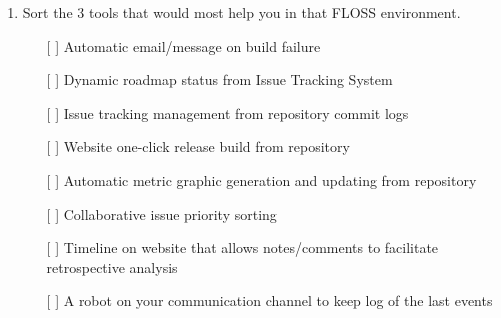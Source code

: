 \documentclass[lnbip]{svmultln}
\begin{document}
\begin{enumerate}
\item Sort the 3 tools that would most help you in that FLOSS
  environment.
  \begin{itemize}
  \item[[ ] ] Automatic email/message on build failure
  \item[[ ] ] Dynamic roadmap status from Issue Tracking System
  \item[[ ] ] Issue tracking management from repository commit logs
  \item[[ ] ] Website one-click release build from repository
  \item[[ ] ] Automatic metric graphic generation and updating from
    repository
  \item[[ ] ] Collaborative issue priority sorting
  \item[[ ] ] Timeline on website that allows notes/comments to
    facilitate retrospective analysis
  \item[[ ] ] A robot on your communication channel to keep log of the
    last events
  \end{itemize}
\end{enumerate}
\end{document}
